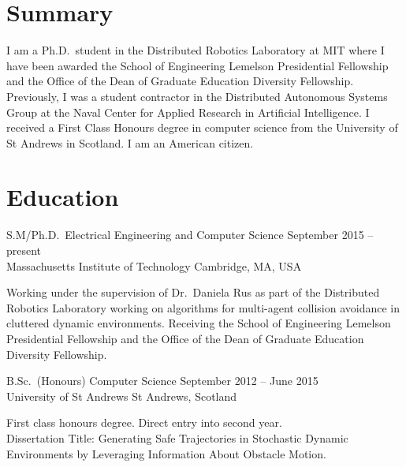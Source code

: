 \documentclass[line,margin]{cv}
\begin{document}
\address{Email: \href{mailto:wallar@mit.edu}{wallar@mit.edu}
\\Website: \href{http://wallar.me}
{http://wallar.me}}
\address{Last Updated: \today}

\begin{resume}

\section{Summary}

I am a Ph.D.\ student in the Distributed Robotics Laboratory at MIT
where I have been awarded the School of Engineering Lemelson
Presidential Fellowship and the Office of the Dean of Graduate Education
Diversity Fellowship. Previously, I was a student contractor in the Distributed
Autonomous Systems Group at the Naval Center for Applied Research in Artificial
Intelligence. I received a First Class Honours degree in computer science from
the University of St Andrews in Scotland. I am an American citizen.

\section{Education}

S.M/Ph.D.\ Electrical Engineering and Computer Science
\hfill September 2015 -- present\\
Massachusetts Institute of Technology \hfill Cambridge, MA, USA
\begin{adjustwidth}{2.5em}{2.5em}

    Working under the supervision of Dr.\ Daniela Rus as part of the
    Distributed Robotics Laboratory working on algorithms for multi-agent
    collision avoidance in cluttered dynamic environments. Receiving the School
    of Engineering Lemelson Presidential Fellowship and the Office of the Dean
    of Graduate Education Diversity Fellowship.

\end{adjustwidth}

B.Sc.\ (Honours) Computer Science
\hfill September 2012 -- June 2015 \\
University of St Andrews \hfill St Andrews, Scotland
\begin{adjustwidth}{2.5em}{2.5em}

    First class honours degree. Direct entry into second year.\\ Dissertation
    Title: Generating Safe Trajectories in Stochastic Dynamic Environments by
    Leveraging Information About Obstacle Motion.


\end{adjustwidth}
\end{resume}
\end{document}
